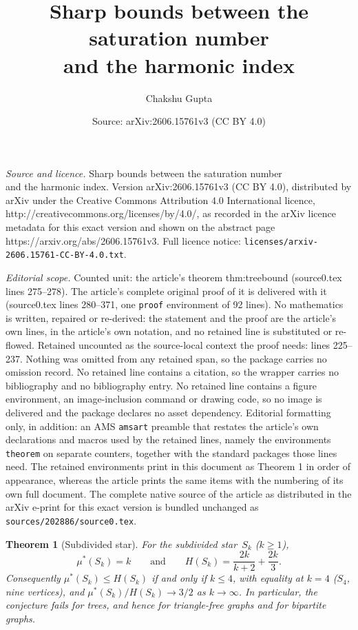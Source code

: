\documentclass[10pt,a4paper]{amsart}
\title{Sharp bounds between the saturation number\\ and the harmonic index}
\author{Chakshu Gupta}
\date{Source: arXiv:2606.15761v3 (CC BY 4.0)}
\newtheorem{theorem}{Theorem}
\newcommand{\mustar}{\mu^{*}}
\begin{document}
\maketitle

\noindent\emph{Source and licence.} Sharp bounds between the saturation number\\ and the harmonic index. Version arXiv:2606.15761v3 (CC BY 4.0), distributed by arXiv under the Creative Commons Attribution 4.0 International licence, http://creativecommons.org/licenses/by/4.0/, as recorded in the arXiv licence metadata for this exact version and shown on the abstract page https://arxiv.org/abs/2606.15761v3. Full licence notice: \texttt{licenses/arxiv-2606.15761-CC-BY-4.0.txt}.\par\smallskip

\noindent\textit{Editorial scope.} Counted unit: the article's theorem thm:treebound (source0.tex lines 275--278). The article's complete original proof of it is delivered with it (source0.tex lines 280--371, one \texttt{proof} environment of 92 lines). No mathematics is written, repaired or re-derived: the statement and the proof are the article's own lines, in the article's own notation, and no retained line is substituted or re-flowed.  Retained uncounted as the source-local context the proof needs: lines 225--237.  Nothing was omitted from any retained span, so the package carries no omission record.  No retained line contains a citation, so the wrapper carries no bibliography and no bibliography entry.  No retained line contains a figure environment, an image-inclusion command or drawing code, so no image is delivered and the package declares no asset dependency.  Editorial formatting only, in addition: an AMS \texttt{amsart} preamble that restates the article's own declarations and macros used by the retained lines, namely the environments \texttt{theorem} on separate counters, together with the standard packages those lines need.  The retained environments print in this document as Theorem 1 in order of appearance, whereas the article prints the same items with the numbering of its own full document.  The complete native source of the article as distributed in the arXiv e-print for this exact version is bundled unchanged as \texttt{sources/202886/source0.tex}.
\begin{theorem}[Subdivided star]\label{thm:tree}
For the subdivided star~$S_k$ ($k \ge 1$),
\[
  \mustar(S_k) = k
  \qquad\text{and}\qquad
  H(S_k) = \frac{2k}{k+2} + \frac{2k}{3}.
\]
Consequently $\mustar(S_k) \le H(S_k)$ if and only if $k \le 4$, with
equality at $k = 4$ ($S_4$, nine vertices), and
$\mustar(S_k)/H(S_k) \to 3/2$ as $k \to \infty$.  In particular, the
conjecture fails for trees, and hence for triangle-free graphs and for
bipartite graphs.
\end{theorem}
\end{document}
